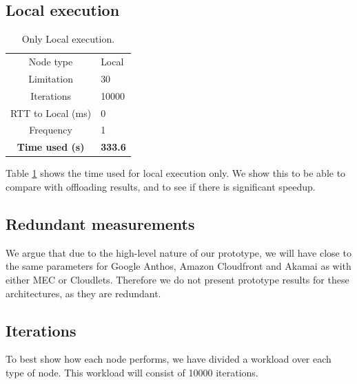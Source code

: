 
\subsection{Local execution}
\begin{table}[h!]
    \centering
    \begin{tabular}[c]{c|p{2cm}}

        Node type & Local \\

        Limitation          & 30  \\

        Iterations          & 10000  \\

        RTT to Local (ms)   & 0  \\

        Frequency           & 1 \\

        \hline
        \textbf{Time used (s)} & \textbf{333.6} \\

    \end{tabular}
    \caption{Only Local execution.}
    \label{tab:local_execution}
\end{table}
Table \ref{tab:local_execution} shows the time used for local execution only. We show this to be able to compare with offloading results, and to see if there is significant speedup.

\subsection{Redundant measurements}
We argue that due to the high-level nature of our prototype, we will have close to the same parameters for Google Anthos, Amazon Cloudfront and Akamai as with either MEC or Cloudlets. Therefore we do not present prototype results for these architectures, as they are redundant.

\subsection{Iterations}
To best show how each node performs, we have divided a workload over each type of node. This workload will consist of 10000 iterations.









